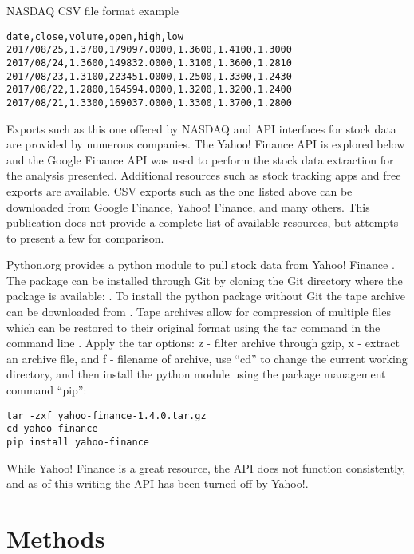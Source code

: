 \documentclass[sigconf]{acmart}
\begin{document}
\begin{table}[htb]
\caption{NASDAQ CSV file format example}\label{T:nasdaq} 
\begin{verbatim}
date,close,volume,open,high,low
2017/08/25,1.3700,179097.0000,1.3600,1.4100,1.3000
2017/08/24,1.3600,149832.0000,1.3100,1.3600,1.2810
2017/08/23,1.3100,223451.0000,1.2500,1.3300,1.2430
2017/08/22,1.2800,164594.0000,1.3200,1.3200,1.2400
2017/08/21,1.3300,169037.0000,1.3300,1.3700,1.2800
\end{verbatim}
\end{table}


Exports such as this one offered by NASDAQ and API interfaces for stock data are provided by numerous companies. The Yahoo! Finance API is explored below and the Google Finance API was used to perform the stock data extraction for the analysis presented. Additional resources such as stock tracking apps and free exports are available. CSV exports such as the one listed above can be downloaded from Google Finance, Yahoo! Finance, and many others. This publication does not provide a complete list of available resources, but attempts to present a few for comparison. 

Python.org provides a python module to pull stock data from Yahoo! Finance \cite{www-python-yahoo}. The package can be installed through Git by cloning the Git directory where the package is available: \cite{www-yahooStock}. To install the python package without Git the tape archive can be downloaded from \cite{www-pythonYahooStock}.  Tape archives allow for compression of multiple files which can be restored to their original format using the tar command in the command line \cite{www-tar}.  Apply the tar options: z - filter archive through gzip, x - extract an archive file, and f - filename of archive, use ``cd'' to change the current working directory, and then install the python module using the package management command ``pip'':
\begin{verbatim}
tar -zxf yahoo-finance-1.4.0.tar.gz
cd yahoo-finance
pip install yahoo-finance
\end{verbatim}
While Yahoo! Finance is a great resource, the API does not function consistently, and as of this writing the API has been turned off by Yahoo!.


\section{Methods}
\end{document}
